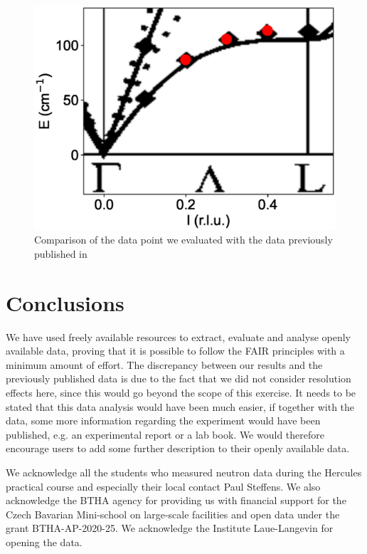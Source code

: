 \documentclass[aps,pra,reprint,amsmath,amssymb,superscriptaddress,showkeys]{revtex4-1}
\begin{document}
\begin{figure}
    \includegraphics[width=1.0\linewidth]{dispersion.eps}
    \caption{Comparison of the data point we evaluated with the data previously published in \cite{Aouissi} }
    \label{fig2}
\end{figure}



\section{Conclusions}

We have used freely available resources to extract, evaluate and analyse openly available data, proving that it is possible to follow the FAIR principles with a minimum amount of effort. 
The discrepancy between our results and the previously published data \cite{Aouissi} is due to the fact that we did not consider resolution effects here, since this would go beyond the scope of this exercise.
It needs to be stated that this data analysis would have been much easier, if together with the data, some more information regarding the experiment would have been published, e.g. an experimental report or a lab book.
We would therefore encourage users to add some further description to their openly available data. 


\begin{acknowledgments}
We acknowledge all the students who measured neutron data \cite{data} during the Hercules practical course and especially their local contact Paul Steffens. 
We also acknowledge the BTHA agency for providing us with financial support for the Czech Bavarian Mini-school on large-scale facilities and open data under the grant BTHA-AP-2020-25. We acknowledge the Institute Laue-Langevin for opening the data.
\end{acknowledgments}



\end{document}
